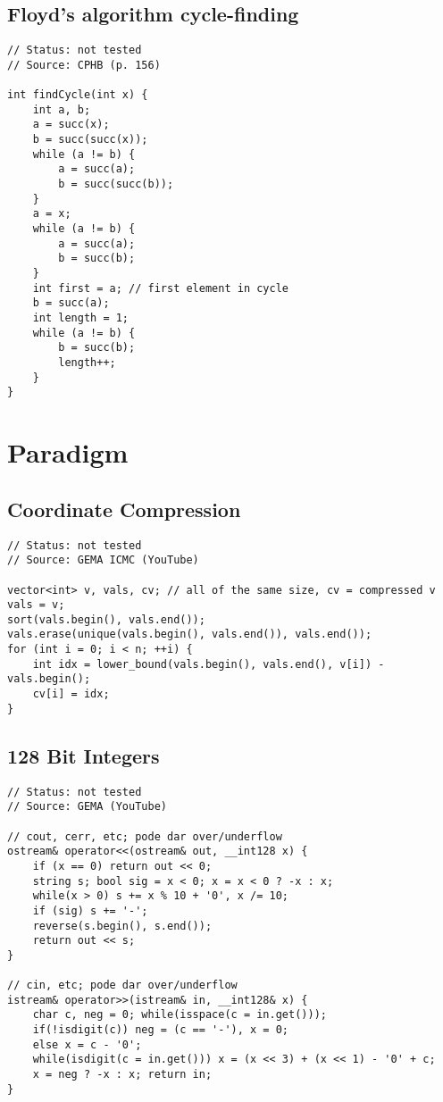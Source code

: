 \documentclass[12pt, a4paper, twoside]{article}
\begin{document}
\subsection{Floyd's algorithm cycle-finding}
\begin{lstlisting}
// Status: not tested
// Source: CPHB (p. 156)

int findCycle(int x) {
	int a, b;
	a = succ(x);
	b = succ(succ(x));
	while (a != b) {
		a = succ(a);
		b = succ(succ(b));
	}
	a = x;
	while (a != b) {
		a = succ(a);
		b = succ(b);
	}
	int first = a; // first element in cycle
	b = succ(a);
	int length = 1;
	while (a != b) {
		b = succ(b);
		length++;
	}
}
\end{lstlisting}



\section{Paradigm}

\subsection{Coordinate Compression}
\begin{lstlisting}
// Status: not tested
// Source: GEMA ICMC (YouTube)

vector<int> v, vals, cv; // all of the same size, cv = compressed v
vals = v;
sort(vals.begin(), vals.end());
vals.erase(unique(vals.begin(), vals.end()), vals.end());
for (int i = 0; i < n; ++i) {
	int idx = lower_bound(vals.begin(), vals.end(), v[i]) - vals.begin();
	cv[i] = idx;
}
\end{lstlisting}

\subsection{128 Bit Integers}
\begin{lstlisting}
// Status: not tested
// Source: GEMA (YouTube)

// cout, cerr, etc; pode dar over/underflow
ostream& operator<<(ostream& out, __int128 x) {
    if (x == 0) return out << 0;
    string s; bool sig = x < 0; x = x < 0 ? -x : x;
    while(x > 0) s += x % 10 + '0', x /= 10;
    if (sig) s += '-';
    reverse(s.begin(), s.end());
    return out << s;
}

// cin, etc; pode dar over/underflow
istream& operator>>(istream& in, __int128& x) {
    char c, neg = 0; while(isspace(c = in.get()));
    if(!isdigit(c)) neg = (c == '-'), x = 0;
    else x = c - '0';
    while(isdigit(c = in.get())) x = (x << 3) + (x << 1) - '0' + c;
    x = neg ? -x : x; return in;
}
\end{lstlisting}
\end{document}

